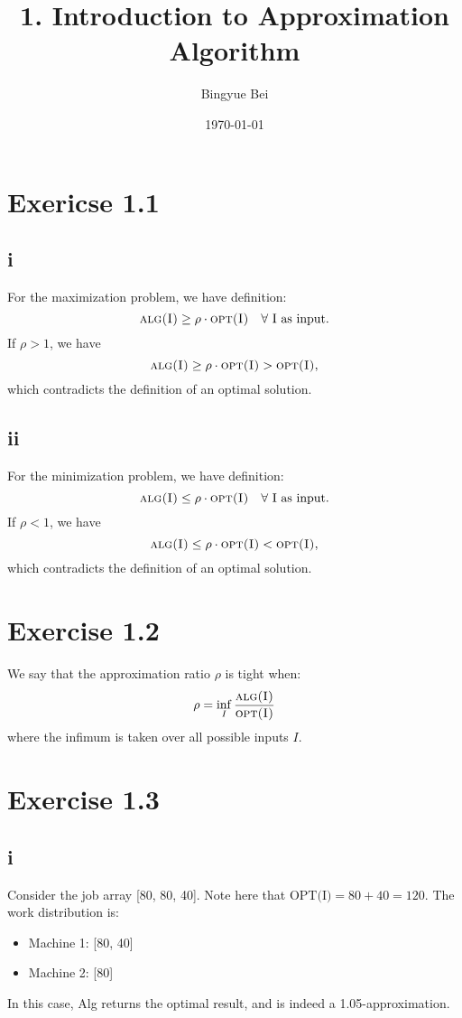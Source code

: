 \documentclass[11pt]{article}
\begin{document}
\title{1. Introduction to Approximation Algorithm}
\author{Bingyue Bei}
\date{\today}
\maketitle

\section*{Exericse 1.1}
\subsection*{i} \noindent
For the maximization problem, we have definition: 
\[
\textsc{alg(I)} \geq \rho \cdot \textsc{opt(I)} \quad \forall \text { I} \text{ as input.}
\]
If $\rho > 1$, we have
\[
\textsc{alg(I)} \geq \rho \cdot \textsc{opt(I)} > \textsc{opt(I)},
\]
which contradicts the definition of an optimal solution.
\subsection*{ii} \noindent
For the minimization problem, we have definition: 
\[
\textsc{alg(I)} \leq \rho \cdot \textsc{opt(I)} \quad \forall \text { I} \text{ as input.}
\]
If $\rho < 1$, we have
\[
\textsc{alg(I)} \leq \rho \cdot \textsc{opt(I)} < \textsc{opt(I)},
\]
which contradicts the definition of an optimal solution.

\section*{Exercise 1.2}
We say that the approximation ratio $\rho$ is tight when:
\[
\rho = \inf_{I} \frac{\textsc{alg(I)}}{\textsc{opt(I)}}
\]
where the infimum is taken over all possible inputs $I$.

\section*{Exercise 1.3}
\subsection*{i} \noindent
Consider the job array [80, 80, 40]. Note here that $\text{OPT(I)} = 80 + 40 = 120$.  
The work distribution is:
\begin{itemize}
    \item Machine 1: [80, 40]
    \item Machine 2: [80]
\end{itemize}
In this case, Alg returns the optimal result, 
and is indeed a 1.05-approximation.
\end{document}
